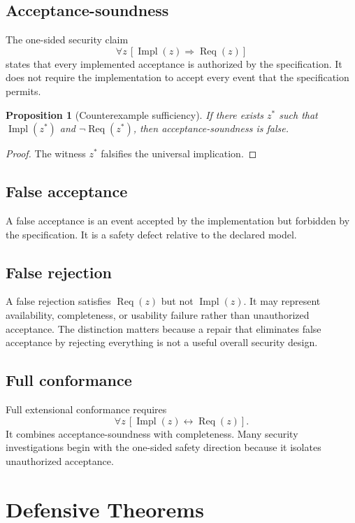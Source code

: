 \documentclass[11pt,oneside]{book}
\newtheorem{proposition}[theorem]{Proposition}
\theoremstyle{definition}
\theoremstyle{remark}
\newcommand{\Impl}{\operatorname{Impl}}
\newcommand{\Req}{\operatorname{Req}}
\begin{document}
\section{Acceptance-soundness}
\label{sec:acceptance-soundness}
The one-sided security claim
\[
\forall z\,[\Impl(z)\Rightarrow\Req(z)]
\]
states that every implemented acceptance is authorized by the specification. It does not require the implementation to accept every event that the specification permits.

\begin{proposition}[Counterexample sufficiency]
If there exists $z^*$ such that $\Impl(z^*)$ and $\neg\Req(z^*)$, then acceptance-soundness is false.
\end{proposition}

\begin{proof}
The witness $z^*$ falsifies the universal implication.
\end{proof}

\section{False acceptance}
A false acceptance is an event accepted by the implementation but forbidden by the specification. It is a safety defect relative to the declared model.

\section{False rejection}
A false rejection satisfies $\Req(z)$ but not $\Impl(z)$. It may represent availability, completeness, or usability failure rather than unauthorized acceptance. The distinction matters because a repair that eliminates false acceptance by rejecting everything is not a useful overall security design.

\section{Full conformance}
Full extensional conformance requires
\[
\forall z\,[\Impl(z)\leftrightarrow\Req(z)].
\]
It combines acceptance-soundness with completeness. Many security investigations begin with the one-sided safety direction because it isolates unauthorized acceptance.

\chapter{Defensive Theorems}
\label{ch:defensive-theorems}
\end{document}
